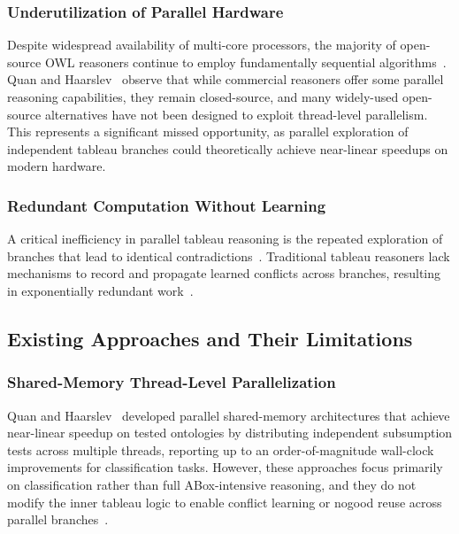 \documentclass[preprint,12pt]{elsarticle}
\begin{document}
\subsubsection{Underutilization of Parallel Hardware}

Despite widespread availability of multi-core processors, the majority of open-source OWL reasoners continue to employ fundamentally sequential algorithms~\cite{quan2017parallel}. Quan and Haarslev~\cite{quan2017parallel} observe that while commercial reasoners offer some parallel reasoning capabilities, they remain closed-source, and many widely-used open-source alternatives have not been designed to exploit thread-level parallelism. This represents a significant missed opportunity, as parallel exploration of independent tableau branches could theoretically achieve near-linear speedups on modern hardware.

\subsubsection{Redundant Computation Without Learning}

A critical inefficiency in parallel tableau reasoning is the repeated exploration of branches that lead to identical contradictions~\cite{steigmiller2020parallelised}. Traditional tableau reasoners lack mechanisms to record and propagate learned conflicts across branches, resulting in exponentially redundant work~\cite{motik2009hypertableau}.

\subsection{Existing Approaches and Their Limitations}

\subsubsection{Shared-Memory Thread-Level Parallelization}

Quan and Haarslev~\cite{quan2017parallel,quan2019framework} developed parallel shared-memory architectures that achieve near-linear speedup on tested ontologies by distributing independent subsumption tests across multiple threads, reporting up to an order-of-magnitude wall-clock improvements for classification tasks. However, these approaches focus primarily on classification rather than full ABox-intensive reasoning, and they do not modify the inner tableau logic to enable conflict learning or nogood reuse across parallel branches~\cite{quan2019framework}.
\end{document}
